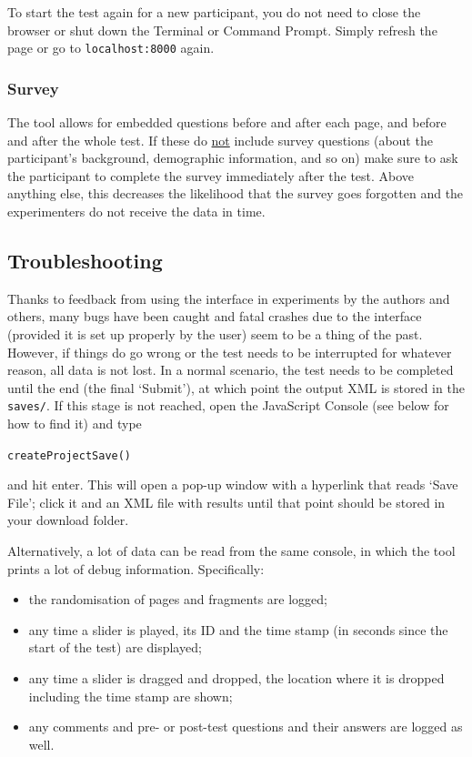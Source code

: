 \documentclass[11pt, oneside]{article}   	%
\begin{document}
			To start the test again for a new participant, you do not need to close the browser or shut down the Terminal or Command Prompt. Simply refresh the page or go to \texttt{localhost:8000} again. 
			
			
		\subsubsection{Survey}
			The tool allows for embedded questions before and after each page, and before and after the whole test. If these do \underline{not} include survey questions (about the participant's background, demographic information, and so on) make sure to ask the participant to complete the survey immediately after the test. Above anything else, this decreases the likelihood that the survey goes forgotten and the experimenters do not receive the data in time. 
	
\clearpage
	\subsection{Troubleshooting} \label{sec:troubleshooting}
		Thanks to feedback from using the interface in experiments by the authors and others, many bugs have been caught and fatal crashes due to the interface (provided it is set up properly by the user) seem to be a thing of the past. 
		However, if things do go wrong or the test needs to be interrupted for whatever reason, all data is not lost. In a normal scenario, the test needs to be completed until the end (the final `Submit'), at which point the output XML is stored in the \texttt{saves/}. If this stage is not reached, open the JavaScript Console (see below for how to find it) and type 

		\texttt{createProjectSave()}

		and hit enter. This will open a pop-up window with a hyperlink that reads `Save File'; click it and an XML file with results until that point should be stored in your download folder. 
		
		Alternatively, a lot of data can be read from the same console, in which the tool prints a lot of debug information. Specifically:
        	\begin{itemize}
            	\item the randomisation of pages and fragments are logged;
            	\item any time a slider is played, its ID and the time stamp (in seconds since the start of the test) are displayed;
            	\item any time a slider is dragged and dropped, the location where it is dropped including the time stamp are shown; 
            	\item any comments and pre- or post-test questions and their answers are logged as well. 
        	\end{itemize}
\end{document}

